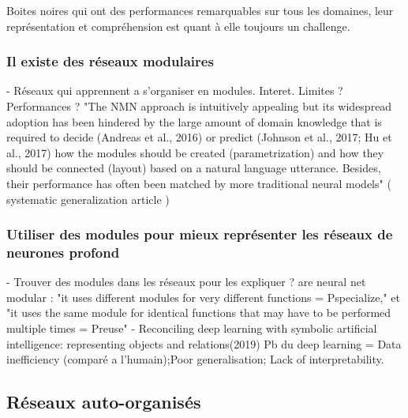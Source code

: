 Boites noires qui ont des performances remarquables sur tous les domaines, leur représentation et compréhension est quant à elle toujours un challenge.

\subsubsection{Il existe des réseaux modulaires}
- Réseaux qui apprennent a s'organiser en modules. Interet. Limites ? Performances ? \cite{Andreas2016NeuralMN,Kirsch2018ModularNL}
"The NMN approach is intuitively appealing but its
widespread adoption has been hindered by the large amount of domain knowledge that is required
to decide (Andreas et al., 2016) or predict (Johnson et al., 2017; Hu et al., 2017) how the modules
should be created (parametrization) and how they should be connected (layout) based on a natural
language utterance. Besides, their performance has often been matched by more traditional neural
models" ( systematic generalization article ) 

\subsubsection{Utiliser des modules pour mieux représenter les réseaux de neurones profond}
- Trouver des modules dans les réseaux pour les expliquer ? \cite{Watanabe2018ModularRO,Csordas2021AreNN}
are neural net modular : "it uses different modules for very different functions = Pspecialize," et "it uses the same module for identical functions that
may have to be performed multiple times = Preuse"
- Reconciling deep learning with symbolic artificial intelligence: representing objects and relations(2019)
Pb du deep learning = Data inefficiency (comparé a l'humain);Poor generalisation; Lack of interpretability.

\subsection{Réseaux auto-organisés}

